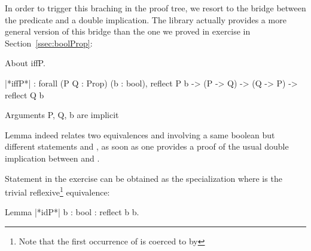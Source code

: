 
In order to trigger this braching in the proof tree, we resort to the
bridge between the  predicate and a double implication.
The  library actually provides a more general version of
this bridge than the one we proved in exercise in
Section~\ref{ssec:boolProp}:

\begin{coq}{}{}
About iffP.
\end{coq}

\begin{coqout}{}{}
|*iffP*| :
forall (P Q : Prop) (b : bool),
reflect P b -> (P -> Q) -> (Q -> P) -> reflect Q b

Arguments P, Q, b are implicit
\end{coqout}
Lemma  indeed relates two equivalences 
and  involving a same boolean  but different
 statements  and , as soon as one
provides a proof of the usual double implication between  and
. 

Statement  in the exercise can be obtained as the
specialization  where  is the
trivial reflexive\footnote{Note that the first occurrence of  is
coerced to  by } equivalence:

\begin{coq}{}{}
Lemma |*idP*| {b : bool} : reflect b b.
\end{coq}

